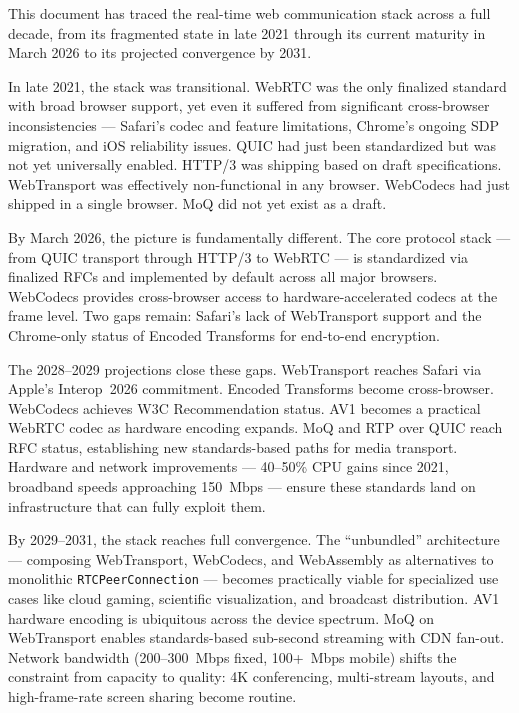 \documentclass[11pt]{article}
\begin{document}
This document has traced the real-time web communication stack across a full
decade, from its fragmented state in late 2021 through its current maturity in
March 2026 to its projected convergence by 2031.

In late 2021, the stack was transitional. WebRTC was the only finalized
standard with broad browser support, yet even it suffered from significant
cross-browser inconsistencies --- Safari's codec and feature limitations,
Chrome's ongoing SDP migration, and iOS reliability issues. QUIC had just been
standardized but was not yet universally enabled. HTTP/3 was shipping based on
draft specifications. WebTransport was effectively non-functional in any
browser. WebCodecs had just shipped in a single browser. MoQ did not yet exist
as a draft.

By March 2026, the picture is fundamentally different. The core protocol stack
--- from QUIC transport through HTTP/3 to WebRTC --- is standardized via
finalized RFCs and implemented by default across all major browsers. WebCodecs
provides cross-browser access to hardware-accelerated codecs at the frame
level. Two gaps remain: Safari's lack of WebTransport support and the
Chrome-only status of Encoded Transforms for end-to-end encryption.

The 2028--2029 projections close these gaps. WebTransport reaches Safari via
Apple's Interop~2026 commitment. Encoded Transforms become cross-browser.
WebCodecs achieves W3C Recommendation status. AV1 becomes a practical WebRTC
codec as hardware encoding expands. MoQ and RTP over QUIC reach RFC status,
establishing new standards-based paths for media transport. Hardware and
network improvements --- 40--50\% CPU gains since 2021, broadband speeds
approaching 150~Mbps --- ensure these standards land on infrastructure that
can fully exploit them.

By 2029--2031, the stack reaches full convergence. The ``unbundled''
architecture --- composing WebTransport, WebCodecs, and WebAssembly as
alternatives to monolithic \texttt{RTCPeerConnection} --- becomes practically
viable for specialized use cases like cloud gaming, scientific visualization,
and broadcast distribution. AV1 hardware encoding is ubiquitous across the
device spectrum. MoQ on WebTransport enables standards-based sub-second
streaming with CDN fan-out. Network bandwidth (200--300~Mbps fixed, 100+~Mbps
mobile) shifts the constraint from capacity to quality: 4K conferencing,
multi-stream layouts, and high-frame-rate screen sharing become routine.
\end{document}
